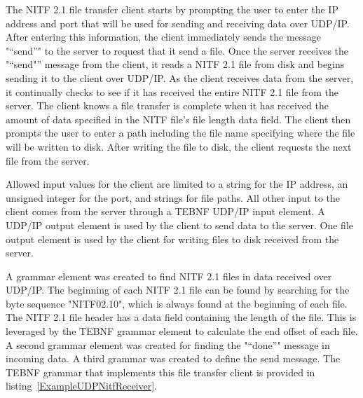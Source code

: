 \indent
The NITF 2.1 file transfer client starts by prompting the user to enter the IP address and port that will be used for sending and receiving data over UDP/IP.  After entering this information, the client immediately sends the message "“send”" to the server to request that it send a file.  Once the server receives the "“send"” message from the client, it reads a NITF 2.1 file from disk and begins sending it to the client over UDP/IP.  As the client receives data from the server, it continually checks to see if it has received the entire NITF 2.1 file from the server.  The client knows a file transfer is complete when it has received the amount of data specified in the NITF file’s file length data field.  The client then prompts the user to enter a path including the file name specifying where the file will be written to disk.  After writing the file to disk, the client requests the next file from the server.

\indent
Allowed input values for the client are limited to a string for the IP address, an unsigned integer for the port, and strings for file paths.  All other input to the client comes from the server through a TEBNF UDP/IP input element.  A UDP/IP output element is used by the client to send data to the server.  One file output element is used by the client for writing files to disk received from the server.

\indent
A grammar element was created to find NITF 2.1 files in data received over UDP/IP.  The beginning of each NITF 2.1 file can be found by searching for the byte sequence "NITF02.10", which is always found at the beginning of each file.  The NITF 2.1 file header has a data field containing the length of the file.  This is leveraged by the TEBNF grammar element to calculate the end offset of each file.   A second grammar element was created for finding the "“done”" message in incoming data.  A third grammar was created to define the send message.  The TEBNF grammar that implements this file transfer client is provided in listing~\ref{ExampleUDPNitfReceiver}.

